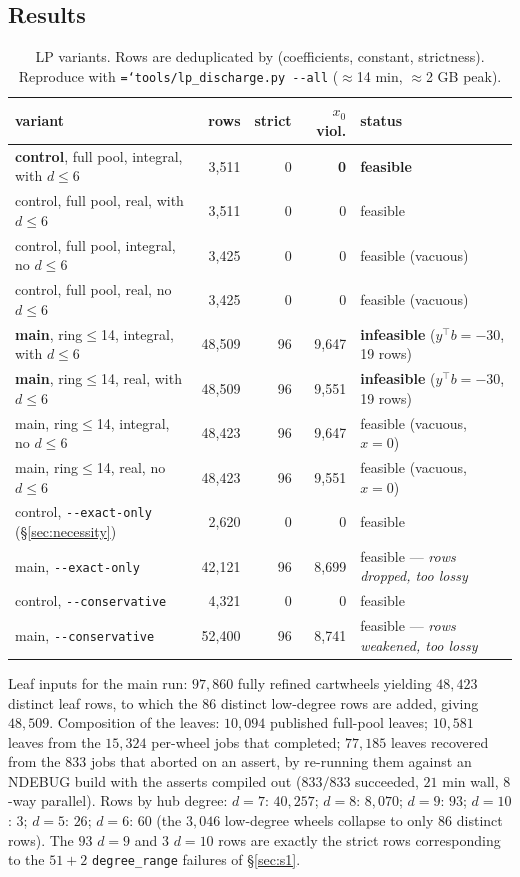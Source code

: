 \documentclass[11pt]{article}
\theoremstyle{definition}
\newcommand{\art}[1]{{\texttt{\hyphenchar\font=`\-\relax #1}}}
\begin{document}
\subsection{Results}

\begin{table}[t]
\centering\small
\caption{LP variants. Rows are deduplicated by (coefficients, constant, strictness).
Reproduce with \art{tools/lp\_discharge.py -{}-all} ($\approx$14 min, $\approx$2 GB peak).}
\label{tab:lpvariants}
\begin{tabular}{lrrrl}
\toprule
variant & rows & strict & $x_0$ viol. & status \\
\midrule
\textbf{control}, full pool, integral, with $d\le6$ & 3{,}511 & 0 & \textbf{0} & \textbf{feasible} \\
control, full pool, real, with $d\le6$ & 3{,}511 & 0 & 0 & feasible \\
control, full pool, integral, no $d\le6$ & 3{,}425 & 0 & 0 & feasible (vacuous) \\
control, full pool, real, no $d\le6$ & 3{,}425 & 0 & 0 & feasible (vacuous) \\
\textbf{main}, ring$\le$14, integral, with $d\le6$ & 48{,}509 & 96 & 9{,}647 & \textbf{infeasible} ($y^\top b=-30$, 19 rows) \\
\textbf{main}, ring$\le$14, real, with $d\le6$ & 48{,}509 & 96 & 9{,}551 & \textbf{infeasible} ($y^\top b=-30$, 19 rows) \\
main, ring$\le$14, integral, no $d\le6$ & 48{,}423 & 96 & 9{,}647 & feasible (vacuous, $x=0$) \\
main, ring$\le$14, real, no $d\le6$ & 48{,}423 & 96 & 9{,}551 & feasible (vacuous, $x=0$) \\
\midrule
control, \texttt{-{}-exact-only} (\S\ref{sec:necessity}) & 2{,}620 & 0 & 0 & feasible \\
main, \texttt{-{}-exact-only} & 42{,}121 & 96 & 8{,}699 & feasible --- \emph{rows dropped, too lossy} \\
control, \texttt{-{}-conservative} & 4{,}321 & 0 & 0 & feasible \\
main, \texttt{-{}-conservative} & 52{,}400 & 96 & 8{,}741 & feasible --- \emph{rows weakened, too lossy} \\
\bottomrule
\end{tabular}
\end{table}

Leaf inputs for the main run: $97{,}860$ fully refined cartwheels yielding $48{,}423$
distinct leaf rows, to which the $86$ distinct low-degree rows are added, giving
$48{,}509$. Composition of the leaves: $10{,}094$ published full-pool leaves; $10{,}581$ leaves
from the $15{,}324$ per-wheel jobs that completed; $77{,}185$ leaves recovered from
the $833$ jobs that aborted on an assert, by re-running them against an NDEBUG build
with the asserts compiled out ($833/833$ succeeded, $21$ min wall, $8$-way parallel).
Rows by hub degree: $d{=}7$: $40{,}257$; $d{=}8$: $8{,}070$; $d{=}9$: $93$;
$d{=}10$: $3$; $d{=}5$: $26$; $d{=}6$: $60$ (the $3{,}046$ low-degree wheels collapse
to only $86$ distinct rows). The $93$ $d{=}9$ and $3$ $d{=}10$ rows are exactly the
strict rows corresponding to the $51+2$ \texttt{degree\_range} failures of
\S\ref{sec:s1}.
\end{document}
